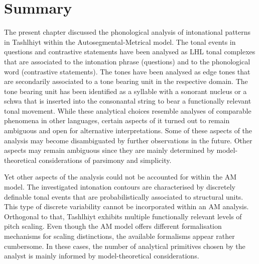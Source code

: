 \section{Summary}\label{sec:7.5}
The present chapter discussed the phonological analysis of intonational patterns in Tashlhiyt within the Autosegmental-Metrical model. The tonal events in questions and contrastive statements have been analysed as LHL tonal complexes that are associated to the intonation phrase (questions) and to the phonological word (contrastive statements). The tones have been analysed as edge tones that are secondarily associated to a tone bearing unit in the respective domain. The tone bearing unit has been identified as a syllable with a sonorant nucleus or a schwa that is inserted into the consonantal string to bear a functionally relevant tonal movement. While these analytical choices resemble analyses of comparable phenomena in other languages, certain aspects of it turned out to remain ambiguous and open for alternative interpretations. Some of these aspects of the analysis may become disambiguated by further observations in the future. Other aspects may remain ambiguous since they are mainly determined by model-theoretical considerations of parsimony and simplicity. 

Yet other aspects of the analysis could not be accounted for within the AM model. The investigated intonation contours are characterised by discretely definable tonal events that are probabilistically associated to structural units. This type of discrete variability cannot be incorporated within an AM analysis. Orthogonal to that, Tashlhiyt exhibits multiple functionally relevant levels of pitch scaling. Even though the AM model offers different formalisation mechanisms for scaling distinctions, the available formalisms appear rather cumbersome. In these cases, the number of analytical primitives chosen by the analyst is mainly informed by model-theoretical considerations. 



